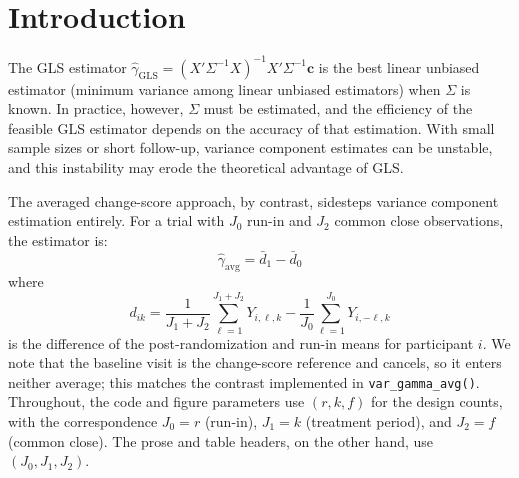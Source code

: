\documentclass[
  11pt,
]{article}
\begin{document}
\begin{abstract}
run-in designs, and the averaged sample size by up to a
factor of roughly 45. Under the \(G\) and \(R\)
misspecifications studied, GLS never loses its advantage
over the simpler estimators. That is, the misspecified-GLS
sandwich variance peaks at 5.3, against an
averaged-estimator variance of 8.9 at the reference
design.
\textbf{Conclusions.} We conclude that GLS is the efficient
estimator under correct specification, and that its
advantage survives the covariance misspecifications
examined here. The averaged change-score estimator
remains useful as a fully prespecified robust benchmark
and a teaching tool. One open robustness question, which
we do not study here, is whether feasible GLS with
variance components estimated from small samples retains
this advantage.
\end{abstract}

{
\setcounter{tocdepth}{2}
\tableofcontents
}
\section{Introduction}\label{introduction}

The GLS estimator \(\hat\gamma_{\text{GLS}} =
(X'\Sigma^{-1}X)^{-1}X'\Sigma^{-1}\mathbf{c}\) is the
best linear unbiased estimator (minimum variance among
linear unbiased estimators) when \(\Sigma\) is known. In
practice, however, \(\Sigma\) must be estimated, and the
efficiency of the feasible GLS estimator depends on the
accuracy of that estimation. With small sample sizes or
short follow-up, variance component estimates can be
unstable, and this instability may erode the
theoretical advantage of GLS.

The averaged change-score approach, by contrast,
sidesteps variance component estimation entirely. For a
trial with \(J_0\) run-in and \(J_2\) common close
observations, the estimator is:
\begin{equation}
  \hat\gamma_{\text{avg}} = \bar{d}_1 - \bar{d}_0
\end{equation}
where
\begin{equation}
  d_{ik} = \frac{1}{J_1 + J_2}
    \sum_{\ell=1}^{J_1+J_2} Y_{i,\ell,k}
    - \frac{1}{J_0}
    \sum_{\ell=1}^{J_0} Y_{i,-\ell,k}
\end{equation}
is the difference of the post-randomization and run-in
means for participant \(i\). We note that the baseline
visit is the change-score reference and cancels, so it
enters neither average; this matches the contrast
implemented in \texttt{var\_gamma\_avg()}. Throughout, the code
and figure parameters use \((r, k, f)\) for the design
counts, with the correspondence \(J_0 = r\) (run-in),
\(J_1 = k\) (treatment period), and \(J_2 = f\) (common
close). The prose and table headers, on the other hand,
use \((J_0, J_1, J_2)\).
\end{document}
